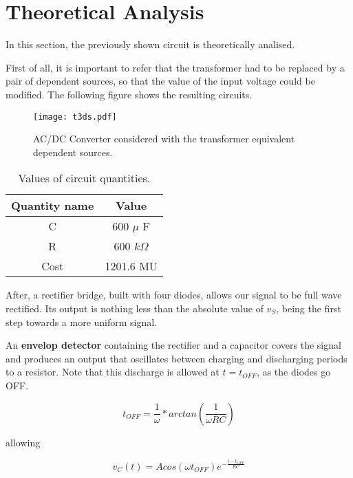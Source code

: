 
\section{Theoretical Analysis}
\label{sec:analysis}
\vspace{3mm}
\par In this section, the previously shown circuit is theoretically analised.
\vspace{3mm}
\par First of all, it is important to refer that the transformer had to be replaced by a pair of dependent sources, so that the value of the input voltage could be modified. The following figure shows the resulting circuits.

\begin{figure}[h] \centering
\texttt{[image: t3ds.pdf]}
\caption{AC/DC Converter considered with the transformer equivalent dependent sources.}
\label{fig:t3ds}
\end{figure}

\vspace{100mm}

\begin{table}[h]
\centering
    \begin{tabular}{c|c}
      Quantity name  & Value\\ \hline
      C & 600 $\mu$ F\\
      R & 600 $k\Omega$ \\
      Cost & 1201.6 MU \\
    \end{tabular}
    \caption{Values of circuit quantities.}
 \label{tab_stefan}
\end{table}

After, a rectifier bridge, built with four diodes, allows our signal to be full wave rectified. Its output is nothing less than the absolute value of $v_S$, being the first step towards a more uniform signal. \par An \textbf{envelop detector} containing the rectifier and a capacitor covers the signal and produces an output that oscillates between charging and discharging periods to a resistor. Note that this discharge is allowed at $t=t_{OFF}$, as the diodes go OFF.

\begin{equation}
  t_{OFF}=\frac{1}{\omega}*arctan(\frac{1}{\omega RC})
\end{equation}

allowing

\begin{equation}
  v_C(t)=Acos(\omega t_{OFF})e^{-\frac{t-t_{OFF}}{RC}}
\end{equation}

